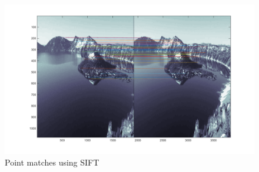 \documentclass[11pt,psfig]{article}
\begin{document}
\begin{figure}[H]
\centering
\includegraphics[width=\columnwidth]{sfmResults1/siftMatchesVLFeat2.png}
\caption{Point matches using SIFT}
\end{figure}
\end{document}
